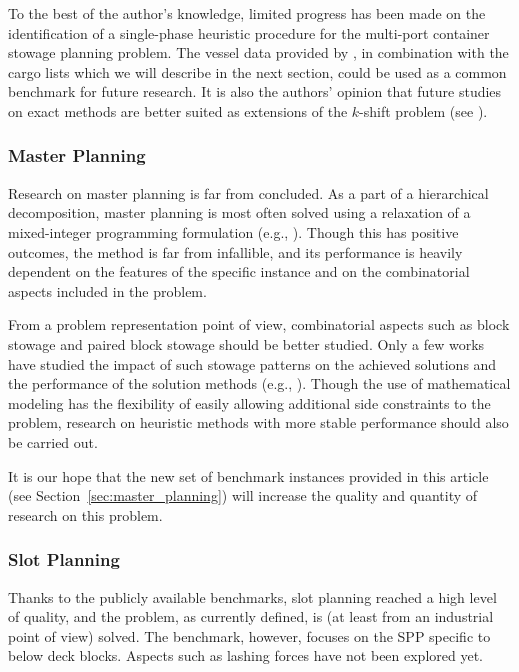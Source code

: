 \documentclass[preprint,12pt,authoryear]{elsarticle}
\begin{document}
To the best of the author's knowledge, limited progress has been made on the identification of a single-phase heuristic procedure for the multi-port container stowage planning problem. 
The vessel data provided by \cite{Larsen2021AProblem}, in combination with the cargo lists which we will describe in the next section, could be used as a common benchmark for future research. It is also the authors' opinion that future studies on exact methods are better suited as extensions of the $k$-shift problem (see \cite{Parreno-Torres2021SolvingAlgorithm}). 

\subsubsection{Master Planning}
Research on master planning is far from concluded. As a part of a hierarchical decomposition, master planning is most often solved using a relaxation of a mixed-integer programming formulation (e.g., \cite{Pacino2011FastVessels,Chou2021ApplyingStudy}). Though this has positive outcomes, the method is far from infallible, and its performance is heavily dependent on the features of the specific instance and on the combinatorial aspects included in the problem. 

From a problem representation point of view, combinatorial aspects such as block stowage and paired block stowage should be better studied. Only a few works have studied the impact of such stowage patterns on the achieved solutions and the performance of the solution methods (e.g., \cite{Wilson2000ContainerSolutions, Liu2011RandomizedPlans, Pacino2018CranePlanning, Larsen2021AProblem}). Though the use of mathematical modeling has the flexibility of easily allowing additional side constraints to the problem, research on heuristic methods with more stable performance should also be carried out. 

It is our hope that the new set of benchmark instances provided in this article (see Section~\ref{sec:master_planning}) will increase the quality and quantity of research on this problem.

\subsubsection{Slot Planning}
Thanks to the publicly available benchmarks, slot planning reached a high level of quality, and the problem, as currently defined, is (at least from an industrial point of view) solved. The benchmark, however, focuses on the SPP specific to below deck blocks. Aspects such as lashing forces have not been explored yet. 
\end{document}
